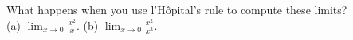 What happens when you use l'H\^{o}pital's rule to compute these 
limits?\\
(a) $\displaystyle\lim_{x\to 0} \frac{x^2} {x}$.\hwendpart
(b) $\displaystyle\lim_{x\to 0} \frac{x^2} {x^3}$.\hwendpart
